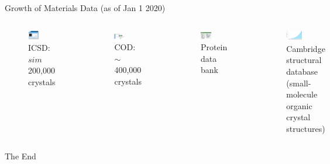 \documentclass[aspectratio=169]{beamer}
\begin{document}
\begin{frame}{Growth of Materials Data (as of Jan 1 2020)}

\begin{columns}
\begin{figure}
        \centering
        \includegraphics[width=0.4\textwidth]{lectures/slides_tex/icsd.png}
        \caption{ICSD: $sim$200,000 crystals
}
    \end{figure}
    \begin{figure}
    \centering
    \includegraphics[width=0.4\textwidth]{lectures/slides_tex/cod.png}
    \caption{COD: $\sim$400,000 crystals
}
\end{figure}

    \begin{figure}
        \centering
        \includegraphics[width=0.4\textwidth]{lectures/slides_tex/pdb.png}
        \caption{Protein data bank}
    \end{figure}
\begin{figure}
    \centering
    \includegraphics[width=0.4\textwidth]{lectures/slides_tex/csd.png}
    \caption{Cambridge structural database (small-molecule organic crystal structures)}
\end{figure}
\end{columns}
\end{frame}


\begin{frame}
    \Huge{\centerline{The End}}
\end{frame}
\end{document}
